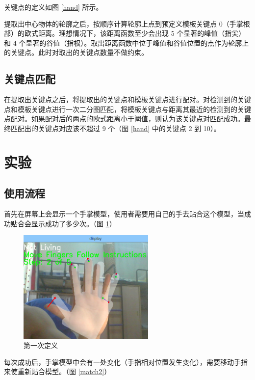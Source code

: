 \documentclass[UTF8, a4paper, fontset=none]{article}
\begin{document}
关键点的定义如图 \ref{hand} 所示。

提取出中心物体的轮廓之后，按顺序计算轮廓上点到预定义模板关键点 0（手掌根部）的欧式距离。理想情况下，该距离函数至少会出现 5 个显著的峰值（指尖）和 4 个显著的谷值（指根）。取出距离函数中位于峰值和谷值位置的点作为轮廓上的关键点。此时对取出的关键点数量不做约束。

\subsection{关键点匹配}

在提取出关键点之后，将提取出的关键点和模板关键点进行配对。对检测到的关键点和模板关键点进行一次二分图匹配，将模板关键点与距离其最近的检测到的关键点配对。如果配对后的两点的欧式距离小于阈值，则认为该关键点对匹配成功。最终匹配出的关键点对应该不超过 9 个（图 \ref{hand} 中的关键点 2 到 10）。

\section{实验}

    \subsection{使用流程}
	
	首先在屏幕上会显示一个手掌模型，使用者需要用自己的手去贴合这个模型，当成功贴合会显示成功了多少次。（图 \ref{match1}）
	
	\begin{figure}
    \centering
    \includegraphics[width=0.6\textwidth]{./test1.png}
    \caption{第一次定义}
    \label{match1}
	\end{figure}
	
	每次成功后，手掌模型中会有一处变化（手指相对位置发生变化），需要移动手指来使重新贴合模型。（图 \ref{match2}）
	
\end{document}
